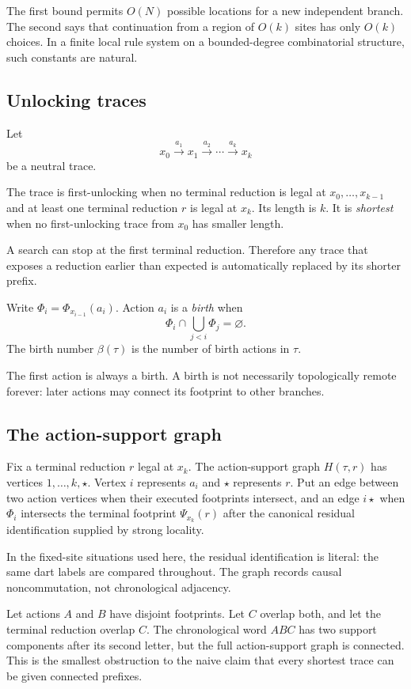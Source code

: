 The first bound permits $O(N)$ possible locations for a new independent branch.
The second says that continuation from a region of $O(k)$ sites has only $O(k)$
choices.  In a finite local rule system on a bounded-degree combinatorial
structure, such constants are natural.

\subsection{Unlocking traces}

Let
\[
 x_0\xrightarrow{a_1}x_1\xrightarrow{a_2}\cdots
 \xrightarrow{a_k}x_k
\]
be a neutral trace.

\begin{definition}
The trace is first-unlocking when no terminal reduction is legal at
$x_0,\ldots,x_{k-1}$ and at least one terminal reduction $r$ is legal at $x_k$.
Its length is $k$.  It is \emph{shortest} when no first-unlocking trace from
$x_0$ has smaller length.
\end{definition}

A search can stop at the first terminal reduction.  Therefore any trace that
exposes a reduction earlier than expected is automatically replaced by its
shorter prefix.

\begin{definition}
Write $\Phi_i=\Phi_{x_{i-1}}(a_i)$.  Action $a_i$ is a \emph{birth} when
\[
  \Phi_i\cap\bigcup_{j<i}\Phi_j=\varnothing.
\]
The birth number $\beta(\tau)$ is the number of birth actions in $\tau$.
\end{definition}

The first action is always a birth.  A birth is not necessarily topologically
remote forever: later actions may connect its footprint to other branches.

\subsection{The action-support graph}

Fix a terminal reduction $r$ legal at $x_k$.  The action-support graph
$H(\tau,r)$ has vertices $1,\ldots,k,\star$.  Vertex $i$ represents $a_i$ and
$\star$ represents $r$.  Put an edge between two action vertices when their
executed footprints intersect, and an edge $i\star$ when $\Phi_i$ intersects
the terminal footprint $\Psi_{x_k}(r)$ after the canonical residual
identification supplied by strong locality.

In the fixed-site situations used here, the residual identification is literal:
the same dart labels are compared throughout.  The graph records causal
noncommutation, not chronological adjacency.

\begin{example}
Let actions $A$ and $B$ have disjoint footprints.  Let $C$ overlap both, and let
the terminal reduction overlap $C$.  The chronological word $ABC$ has two
support components after its second letter, but the full action-support graph is
connected.  This is the smallest obstruction to the naive claim that every
shortest trace can be given connected prefixes.
\end{example}
